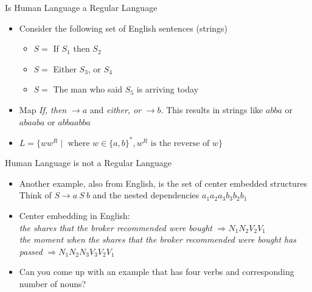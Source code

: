 \documentclass[landscape]{slides}
\begin{document}
\begin{slide}{Is Human Language a Regular Language}
\begin{itemize}
\item Consider the following set of English sentences (strings)
\begin{itemize}
\item $S = $ If $S_1$ then $S_2$
\item $S = $ Either $S_3$, or $S_4$
\item $S = $ The man who said $S_5$ is arriving today
\end{itemize}
\item Map {\em If, then} $\rightarrow a$ and {\em either, or}
$\rightarrow b$. This results in strings like $abba$ or $abaaba$ or
$abbaabba$
\item $L = \{ w w^R \mid \textrm{ where } w \in \{a,b\}^\ast, w^R
\textrm{ is the reverse of } w \}$
\end{itemize}
\end{slide}


\begin{slide}{Human Language is not a Regular Language}
\begin{itemize}
\item Another example, also from English, is the set of center embedded structures\\
Think of $S \rightarrow a\ S\ b$ and the nested dependencies $a_1 a_2 a_3 b_3 b_2 b_1$
\item Center embedding in English:\\
{\em the shares that the broker recommended were bought} $\Rightarrow N_1 N_2 V_2 V_1$\\
{\em the moment when the shares that the broker recommended were bought has passed} $\Rightarrow N_1 N_2 N_3 V_3 V_2 V_1$
\item Can you come up with an example that has four verbs and corresponding number of nouns?
\end{itemize}
\end{slide}
\end{document}
